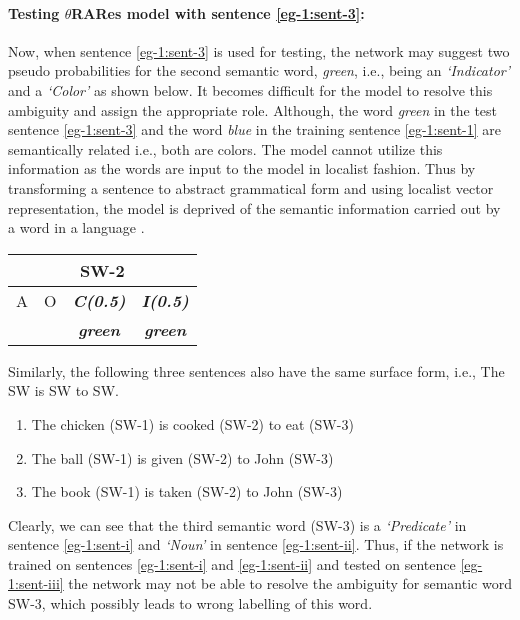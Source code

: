 \paragraph{Testing $\theta$RARes model with sentence \ref{eg-1:sent-3}:} Now, when sentence \ref{eg-1:sent-3} is used for testing, the network may suggest two pseudo probabilities for the second semantic word, \textit{green}, i.e., being an \textit{`Indicator'} and a \textit{`Color'} as shown below. It becomes difficult for the model to resolve this ambiguity and assign the appropriate role. Although, the word \textit{green} in the test sentence \ref{eg-1:sent-3} and the word \textit{blue} in the training sentence \ref{eg-1:sent-1} are semantically related i.e., both are colors. The model cannot utilize this information as the words are input to the model in localist fashion. Thus by transforming a sentence to abstract grammatical form and using localist vector representation, the model is deprived of the semantic information carried out by a word in a language \cite{w2v:tensor_flow}.

\begin{table}[H]
\centering
\begin{minipage}{1.5in}
\begin{tabular}{|c|c|c|c|}
\hline
\multicolumn{4}{|c|}{\textbf{SW-2}}  \\ \hline
A    & O & \textit{\textbf{C(0.5)}}   & \textit{\textbf{I(0.5)}} \\ \hline
    &   & \textit{\textbf{green}}       & \textit{\textbf{green}} \\ \hline
\end{tabular}
\end{minipage}
\end{table}

\noindent Similarly, the following three sentences also have the same surface form, i.e., The SW is SW to SW.

\begin{enumerate}[noitemsep,label=(\roman*)]
\item The chicken (SW-1) is cooked (SW-2) to eat (SW-3) \label{eg-1:sent-i}
\item The ball (SW-1) is given (SW-2) to John (SW-3) \label{eg-1:sent-ii}
\item The book (SW-1) is taken (SW-2) to John (SW-3) \label{eg-1:sent-iii}
\end{enumerate}

Clearly, we can see that the third semantic word (SW-3) is a \textit{`Predicate'} in sentence \ref{eg-1:sent-i} and \textit{`Noun'} in sentence \ref{eg-1:sent-ii}. Thus, if the network is trained on sentences \ref{eg-1:sent-i} and \ref{eg-1:sent-ii} and tested on sentence \ref{eg-1:sent-iii} the network may not be able to resolve the ambiguity for semantic word SW-3, which possibly leads to wrong labelling of this word.

